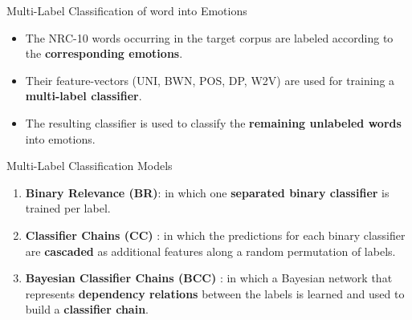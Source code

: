\documentclass[handout]{beamer}
\begin{document}
\begin{frame}{Multi-Label Classification of word into Emotions}
\begin{scriptsize}
\begin{itemize}
\item The NRC-10 words occurring in the target corpus are labeled according to the \textbf{corresponding emotions}.
\item Their feature-vectors (UNI, BWN, POS, DP, W2V) are used for training a \textbf{multi-label classifier}. 
\item   The resulting classifier is used to classify the \textbf{remaining unlabeled words} into emotions. 
\end{itemize}
\end{scriptsize}
\end{frame}


\begin{frame}{Multi-Label Classification Models}
\begin{scriptsize}
\begin{enumerate}
\item \textbf{Binary Relevance (BR)}: in which one \textbf{separated binary classifier} is trained per label.
\item \textbf{Classifier Chains (CC)} \cite{read2011classifier}: in which the predictions for each binary classifier are \textbf{cascaded} as additional features along a random permutation of labels.
\item \textbf{Bayesian Classifier Chains (BCC)} \cite{ZaragozaSMBL11}: in which a Bayesian network that represents \textbf{dependency relations} between the labels is learned and used to build a \textbf{classifier chain}.  
\end{enumerate}
\end{scriptsize}
\end{frame}
\end{document}
